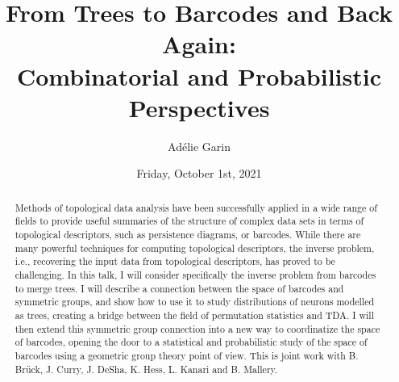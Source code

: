 \documentclass{UAmathtalk}
\author{Ad\'{e}lie Garin}
\title{From Trees to Barcodes and Back Again:\\Combinatorial and Probabilistic Perspectives}
\date{Friday, October 1st, 2021}
\begin{document}
\maketitle

%

\begin{abstract}
Methods of topological data analysis have been successfully applied in a wide range of fields to provide useful summaries of the structure of complex data sets in terms of topological descriptors, such as persistence diagrams, or barcodes. While there are many powerful techniques for computing topological descriptors, the inverse problem, i.e., recovering the input data from topological descriptors, has proved to be challenging. In this talk, I will consider specifically the inverse problem from barcodes to merge trees. I will describe a connection between the space of barcodes and symmetric groups, and show how to use it to study distributions of neurons modelled as trees, creating a bridge between the field of permutation statistics and TDA. I will then extend this symmetric group connection into a new way to coordinatize the space of barcodes, opening the door to a statistical and probabilistic study of the space of barcodes using a geometric group theory point of view. 
This is joint work with B. Brück, J. Curry, J. DeSha, K. Hess, L. Kanari and B. Mallery.
\end{abstract}
\end{document}
